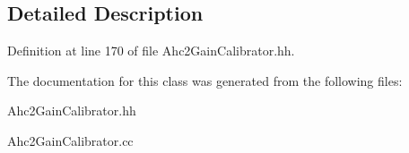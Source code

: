 \subsection{Detailed Description}


Definition at line 170 of file Ahc2GainCalibrator.hh.

The documentation for this class was generated from the following files:\begin{DoxyCompactItemize}
\item 
Ahc2GainCalibrator.hh\item 
Ahc2GainCalibrator.cc\end{DoxyCompactItemize}
